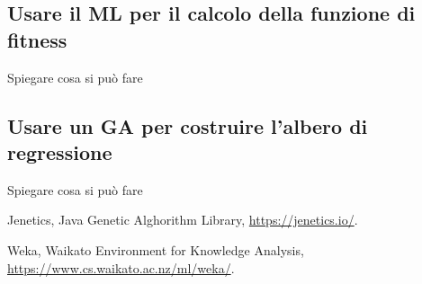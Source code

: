 \documentclass[a4paper, 11pt, oneside]{report}
\begin{document}
                \subsection{Usare il ML per il calcolo della funzione di fitness}
                Spiegare cosa si può fare
                \subsection{Usare un GA per costruire l'albero di regressione}
                Spiegare cosa si può fare


    \begin{thebibliography}{9} %
        Jenetics, Java Genetic Alghorithm Library,
        \url{https://jenetics.io/}.

        Weka, Waikato Environment for Knowledge Analysis,
        \url{https://www.cs.waikato.ac.nz/ml/weka/}.
    \end{thebibliography}
\end{document}
